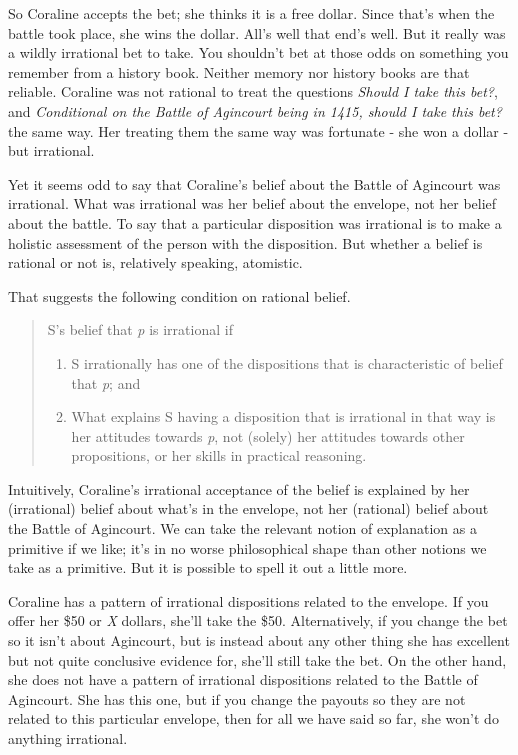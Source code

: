 \documentclass[
  10pt,
  letterpaper,
  twoside]{scrbook}
\providecommand{\tightlist}{%
  \setlength{\itemsep}{0pt}\setlength{\parskip}{0pt}}\usepackage{longtable,booktabs,array}
\begin{document}
So Coraline accepts the bet; she thinks it is a free dollar. Since
that's when the battle took place, she wins the dollar. All's well that
end's well. But it really was a wildly irrational bet to take. You
shouldn't bet at those odds on something you remember from a history
book. Neither memory nor history books are that reliable. Coraline was
not rational to treat the questions \emph{Should I take this bet?}, and
\emph{Conditional on the Battle of Agincourt being in 1415, should I
take this bet?} the same way. Her treating them the same way was
fortunate - she won a dollar - but irrational.

Yet it seems odd to say that Coraline's belief about the Battle of
Agincourt was irrational. What was irrational was her belief about the
envelope, not her belief about the battle. To say that a particular
disposition was irrational is to make a holistic assessment of the
person with the disposition. But whether a belief is rational or not is,
relatively speaking, atomistic.

That suggests the following condition on rational belief.

\begin{quote}
S's belief that \emph{p} is irrational if

\begin{enumerate}
\def\labelenumi{\arabic{enumi}.}
\tightlist
\item
  S irrationally has one of the dispositions that is characteristic of
  belief that \emph{p}; and
\item
  What explains S having a disposition that is irrational in that way is
  her attitudes towards \emph{p}, not (solely) her attitudes towards
  other propositions, or her skills in practical reasoning.
\end{enumerate}
\end{quote}

Intuitively, Coraline's irrational acceptance of the belief is explained
by her (irrational) belief about what's in the envelope, not her
(rational) belief about the Battle of Agincourt. We can take the
relevant notion of explanation as a primitive if we like; it's in no
worse philosophical shape than other notions we take as a primitive. But
it is possible to spell it out a little more.

Coraline has a pattern of irrational dispositions related to the
envelope. If you offer her \$50 or \emph{X} dollars, she'll take the
\$50. Alternatively, if you change the bet so it isn't about Agincourt,
but is instead about any other thing she has excellent but not quite
conclusive evidence for, she'll still take the bet. On the other hand,
she does not have a pattern of irrational dispositions related to the
Battle of Agincourt. She has this one, but if you change the payouts so
they are not related to this particular envelope, then for all we have
said so far, she won't do anything irrational.
\end{document}
